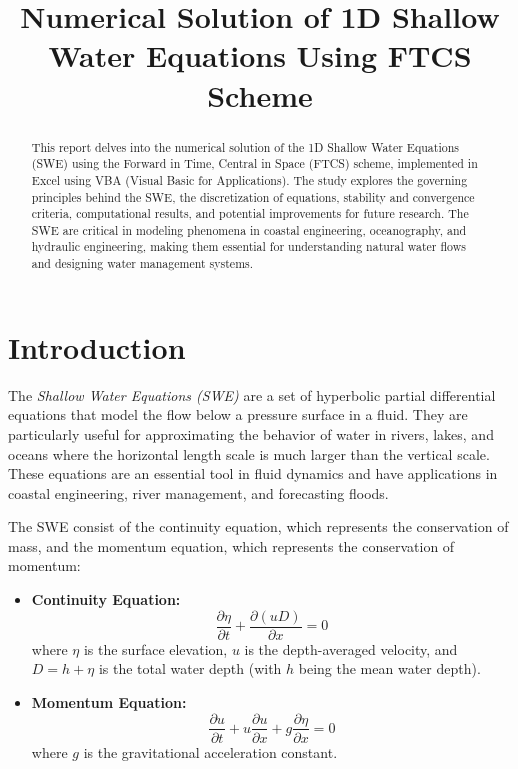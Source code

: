 \documentclass[12pt]{article}
\title{Numerical Solution of 1D Shallow Water Equations Using FTCS Scheme}
\author{}
\date{}
\begin{document}
\maketitle

\begin{abstract}
This report delves into the numerical solution of the 1D Shallow Water Equations (SWE) using the Forward in Time, Central in Space (FTCS) scheme, implemented in Excel using VBA (Visual Basic for Applications). The study explores the governing principles behind the SWE, the discretization of equations, stability and convergence criteria, computational results, and potential improvements for future research. The SWE are critical in modeling phenomena in coastal engineering, oceanography, and hydraulic engineering, making them essential for understanding natural water flows and designing water management systems.
\end{abstract}

\section{Introduction}

The \textit{Shallow Water Equations (SWE)} are a set of hyperbolic partial differential equations that model the flow below a pressure surface in a fluid. They are particularly useful for approximating the behavior of water in rivers, lakes, and oceans where the horizontal length scale is much larger than the vertical scale. These equations are an essential tool in fluid dynamics and have applications in coastal engineering, river management, and forecasting floods.

The SWE consist of the continuity equation, which represents the conservation of mass, and the momentum equation, which represents the conservation of momentum:

\begin{itemize}
    \item \textbf{Continuity Equation:}
    \begin{equation}
        \frac{\partial \eta}{\partial t} + \frac{\partial (uD)}{\partial x} = 0
    \end{equation}
    where \( \eta \) is the surface elevation, \( u \) is the depth-averaged velocity, and \( D = h + \eta \) is the total water depth (with \( h \) being the mean water depth).

    \item \textbf{Momentum Equation:}
    \begin{equation}
        \frac{\partial u}{\partial t} + u\frac{\partial u}{\partial x} + g\frac{\partial \eta}{\partial x} = 0
    \end{equation}
    where \( g \) is the gravitational acceleration constant.
\end{itemize}
\end{document}

